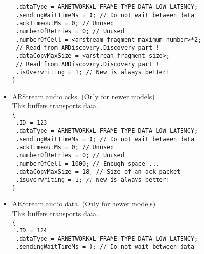 \begin{itemize}
{    \texttt{  .dataType = ARNETWORKAL\_FRAME\_TYPE\_DATA\_LOW\_LATENCY;}\\
    \texttt{  .sendingWaitTimeMs = 0; // Do not wait between data}\\
    \texttt{  .ackTimeoutMs = 0; // Unused}\\
    \texttt{  .numberOfRetries = 0; // Unused}\\
    \texttt{  .numberOfCell = <arstream\_fragment\_maximum\_number>*2;}\\
    \texttt{                  // Read from ARDiscovery.Discovery part !}\\
    \texttt{  .dataCopyMaxSize = <arstream\_fragment\_size>;}\\
    \texttt{                     // Read from ARDiscovery.Discovery part !}\\
    \texttt{  .isOverwriting = 1; // New is always better!}\\
    \texttt{\}}
}
\item{
    ARStream audio acks. (Only for newer models)\\
    This buffers transports  data.\\
    \texttt{\{}\\
    \texttt{  .ID = 123}\\
    \texttt{  .dataType = ARNETWORKAL\_FRAME\_TYPE\_DATA\_LOW\_LATENCY;}\\
    \texttt{  .sendingWaitTimeMs = 0; // Do not wait between data}\\
    \texttt{  .ackTimeoutMs = 0; // Unused}\\
    \texttt{  .numberOfRetries = 0; // Unused}\\
    \texttt{  .numberOfCell = 1000; // Enough space ...}\\
    \texttt{  .dataCopyMaxSize = 18; // Size of an ack packet}\\
    \texttt{  .isOverwriting = 1; // New is always better!}\\
    \texttt{\}}
}
\item{
    ARStream audio data. (Only for newer models)\\
    This buffers transports  data.\\
    \texttt{\{}\\
    \texttt{  .ID = 124}\\
    \texttt{  .dataType = ARNETWORKAL\_FRAME\_TYPE\_DATA\_LOW\_LATENCY;}\\
    \texttt{  .sendingWaitTimeMs = 0; // Do not wait between data}\\
}
\end{itemize}
